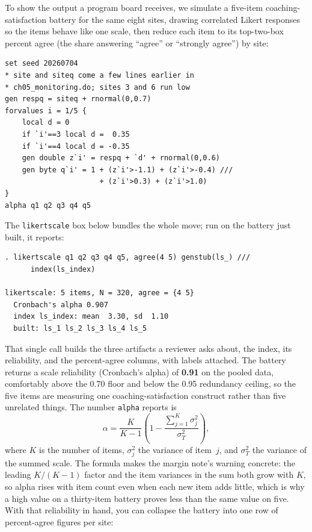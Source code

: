 \documentclass[
    a4paper,
    fontsize=10pt,
    twoside=true,
    numbers=noenddot,
]{kaobook}
\begin{document}
To show the output a program board receives, we simulate a five-item coaching-satisfaction battery for the same eight sites, drawing correlated Likert responses so the items behave like one scale, then reduce each item to its top-two-box percent agree (the share answering \enquote{agree} or \enquote{strongly agree}) by site:
\par
{\footnotesize
\begin{verbatim}
set seed 20260704
* site and siteq come a few lines earlier in
* ch05_monitoring.do; sites 3 and 6 run low
gen respq = siteq + rnormal(0,0.7)
forvalues i = 1/5 {
    local d = 0
    if `i'==3 local d =  0.35
    if `i'==4 local d = -0.35
    gen double z`i' = respq + `d' + rnormal(0,0.6)
    gen byte q`i' = 1 + (z`i'>-1.1) + (z`i'>-0.4) ///
                      + (z`i'>0.3) + (z`i'>1.0)
}
alpha q1 q2 q3 q4 q5
\end{verbatim}
}
The \texttt{likertscale} box below bundles the whole move; run on the battery just built, it reports:
\par
{\footnotesize
\begin{verbatim}
. likertscale q1 q2 q3 q4 q5, agree(4 5) genstub(ls_) ///
      index(ls_index)

likertscale: 5 items, N = 320, agree = {4 5}
  Cronbach's alpha 0.907
  index ls_index: mean  3.30, sd  1.10
  built: ls_1 ls_2 ls_3 ls_4 ls_5
\end{verbatim}
}
That single call builds the three artifacts a reviewer asks about, the index, its reliability, and the percent-agree columns, with labels attached.
The battery returns a scale reliability (Cronbach's alpha) of \textbf{0.91} on the pooled data, comfortably above the 0.70 floor and below the 0.95 redundancy ceiling, so the five items are measuring one coaching-satisfaction construct rather than five unrelated things. The number \texttt{alpha} reports is
\[
  \alpha=\frac{K}{K-1}\left(1-\frac{\sum_{j=1}^{K}\sigma_j^2}{\sigma_T^2}\right),
\]
where $K$ is the number of items, $\sigma_j^2$ the variance of item~$j$, and $\sigma_T^2$ the variance of the summed scale. The formula makes the margin note's warning concrete: the leading $K/(K-1)$ factor and the item variances in the sum both grow with $K$, so alpha rises with item count even when each new item adds little, which is why a high value on a thirty-item battery proves less than the same value on five. With that reliability in hand, you can collapse the battery into one row of percent-agree figures per site:
\end{document}
